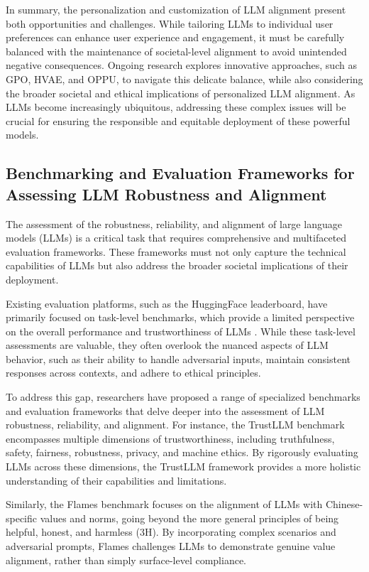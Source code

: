 \documentclass[11pt]{article}
\begin{document}
In summary, the personalization and customization of LLM alignment present both opportunities and challenges. While tailoring LLMs to individual user preferences can enhance user experience and engagement, it must be carefully balanced with the maintenance of societal-level alignment to avoid unintended negative consequences. Ongoing research explores innovative approaches, such as GPO, HVAE, and OPPU, to navigate this delicate balance, while also considering the broader societal and ethical implications of personalized LLM alignment. As LLMs become increasingly ubiquitous, addressing these complex issues will be crucial for ensuring the responsible and equitable deployment of these powerful models.

\subsection{Benchmarking and Evaluation Frameworks for Assessing LLM Robustness and Alignment}

The assessment of the robustness, reliability, and alignment of large language models (LLMs) is a critical task that requires comprehensive and multifaceted evaluation frameworks. These frameworks must not only capture the technical capabilities of LLMs but also address the broader societal implications of their deployment.

Existing evaluation platforms, such as the HuggingFace leaderboard, have primarily focused on task-level benchmarks, which provide a limited perspective on the overall performance and trustworthiness of LLMs \cite{ref65}. While these task-level assessments are valuable, they often overlook the nuanced aspects of LLM behavior, such as their ability to handle adversarial inputs, maintain consistent responses across contexts, and adhere to ethical principles.

To address this gap, researchers have proposed a range of specialized benchmarks and evaluation frameworks that delve deeper into the assessment of LLM robustness, reliability, and alignment. For instance, the TrustLLM benchmark \cite{ref206} encompasses multiple dimensions of trustworthiness, including truthfulness, safety, fairness, robustness, privacy, and machine ethics. By rigorously evaluating LLMs across these dimensions, the TrustLLM framework provides a more holistic understanding of their capabilities and limitations.

Similarly, the Flames benchmark \cite{ref207} focuses on the alignment of LLMs with Chinese-specific values and norms, going beyond the more general principles of being helpful, honest, and harmless (3H). By incorporating complex scenarios and adversarial prompts, Flames challenges LLMs to demonstrate genuine value alignment, rather than simply surface-level compliance.
\end{document}
